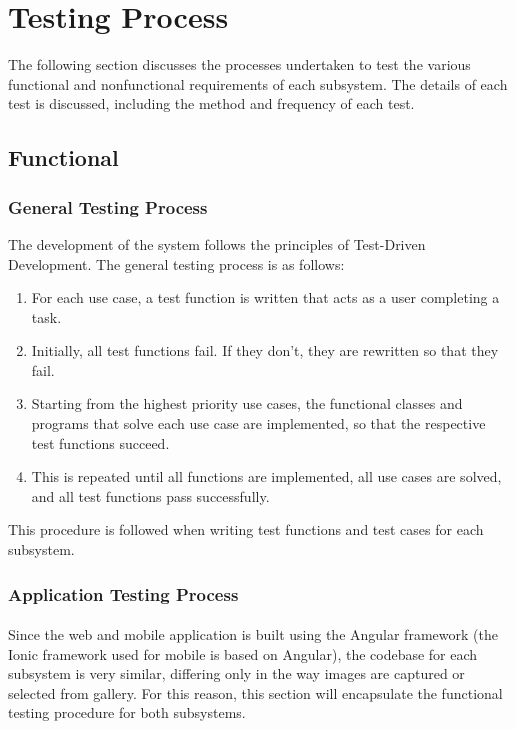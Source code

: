 \documentclass[a4paper, 11pt]{article}
\begin{document}
\section{Testing Process}
The following section discusses the processes undertaken to test the various functional and nonfunctional requirements of each subsystem. The details of each test is discussed, including the method and frequency of each test.

    \subsection{Functional}
    
        \subsubsection{General Testing Process}
        The development of the system follows the principles of Test-Driven Development. The general testing process is as follows:\\
        \begin{enumerate}
            \item For each use case, a test function is written that acts as a user completing a task.
            \item Initially, all test functions fail. If they don’t, they are rewritten so that they fail.
            \item Starting from the highest priority use cases, the functional classes and programs that solve each use case are implemented, so that the respective test functions succeed.
            \item This is repeated until all functions are implemented, all use cases are solved, and all test functions pass successfully.
        \end{enumerate}
        This procedure is followed when writing test functions and test cases for each subsystem.
        
        \subsubsection{Application Testing Process}
        \paragraph{}
        Since the web and mobile application is built using the Angular framework (the Ionic framework used for mobile is based on Angular), the codebase for each subsystem is very similar, differing only in the way images are captured or selected from gallery. For this reason, this section will encapsulate the functional testing procedure for both subsystems.
\end{document}
